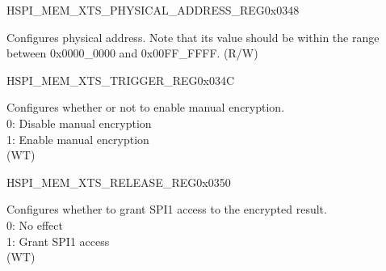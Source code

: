 \begin{register}{H}{SPI\_MEM\_XTS\_PHYSICAL\_ADDRESS\_REG}{0x0348}\label{regdesc:SPIMEMXTSPHYSICALADDRESSREG}
%
%
\regnewline%
\begin{regdesc}\begin{reglist}
\label{fielddesc:SPIMEMXTSPHYSICALADDRESS}\item [SPI\_MEM\_XTS\_PHYSICAL\_ADDRESS] Configures physical address. Note that its value should be within the range between 0x0000\_0000 and 0x00FF\_FFFF. (R/W)
\end{reglist}\end{regdesc}
\end{register}


\begin{register}{H}{SPI\_MEM\_XTS\_TRIGGER\_REG}{0x034C}\label{regdesc:SPIMEMXTSTRIGGERREG}
%
%
\regnewline%
\begin{regdesc}\begin{reglist}
\label{fielddesc:SPIMEMXTSTRIGGER}\item [SPI\_MEM\_XTS\_TRIGGER] Configures whether or not to enable manual encryption. \\
0: Disable manual encryption\\
1: Enable manual encryption\\
(WT)
\end{reglist}\end{regdesc}
\end{register}


\begin{register}{H}{SPI\_MEM\_XTS\_RELEASE\_REG}{0x0350}\label{regdesc:SPIMEMXTSRELEASEREG}
%
%
\regnewline%
\begin{regdesc}\begin{reglist}
\label{fielddesc:SPIMEMXTSRELEASE}\item [SPI\_MEM\_XTS\_RELEASE] Configures whether to grant SPI1 access to the encrypted result. \\
0: No effect\\
1: Grant SPI1 access\\
(WT)
\end{reglist}\end{regdesc}
\end{register}


